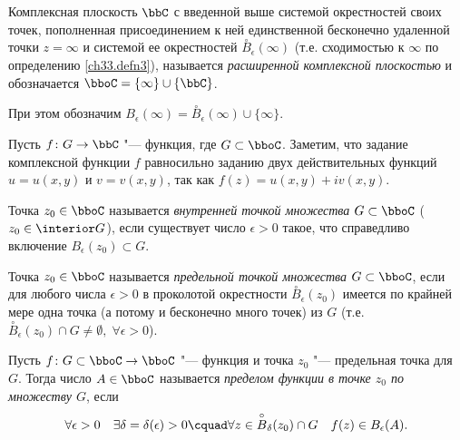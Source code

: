 \begin{defn}
Комплексная плоскость $\bbC$ с введенной выше системой окрестностей своих точек, пополненная присоединением к ней единственной бесконечно удаленной точки $z=\infty$ и системой ее окрестностей $\overset{\circ} {B}_\epsilon(\infty)$ (т.е. сходимостью к $\infty$ по определению \ref{ch33.defn3}), называется \textit{расширенной комплексной плоскостью} и обозначается ${\bboC =\{\infty\} \cup \{\bbC\}}$.
\end{defn}
При этом обозначим $B_\epsilon(\infty)=\overset{\circ} {B}_\epsilon(\infty) \cup\{\infty\}$.

Пусть $f\colon G\to \bbC$ "--- функция, где $G \subset \bboC$. Заметим, что задание комплексной функции $f$ равносильно заданию двух действительных функций $u=u(x,y)$ и $v=v(x,y)$, так как $f(z)=u(x,y)+iv(x,y)$.
\begin{defn}
Точка $z_0 \in \bboC$ называется \textit{внутренней точкой множества} $G \subset \bboC$ ($z_0 \in \interior G$), если существует число $\epsilon > 0$ такое, что справедливо включение $B_\epsilon (z_0) \subset G$.
\end{defn} 

\begin{defn}
Точка $z_0 \in \bboC$ называется \textit{предельной точкой множества} $G \subset \bboC$, если для любого числа $\epsilon > 0$ в проколотой окрестности $\overset{\circ} {B}_\epsilon(z_0)$ имеется по крайней мере одна точка (а потому и бесконечно много точек) из $G$ (т.е. $\overset{\circ} {B}_\epsilon(z_0) \cap G \neq \emptyset,\; \forall\epsilon > 0$).
\end{defn}

\begin{defn}
Пусть $f\colon G\subset \bboC \to \bboC$ "--- функция и точка $z_0$ "--- предельная точка для $G$. Тогда число $A \in \bboC$ называется \textit{пределом функции в точке $z_0$ по множеству $G$}, если 
$$
\forall \epsilon > 0\quad \exists \delta = \delta(\epsilon)>0\cquad\forall z \in \overset{\circ} {B}_\delta(z_0)\cap G \quad f(z) \in B_\epsilon(A). 
$$ 
\end{defn}

